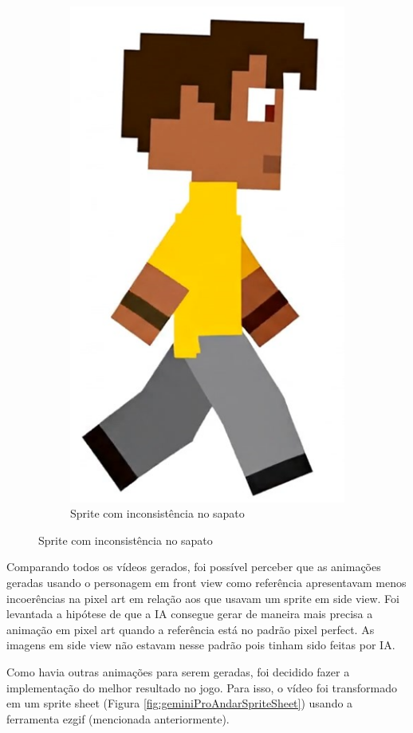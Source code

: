 \begin{figure}[htbp]
\begin{subfigure}{0.32\linewidth}
        \includegraphics[width=0.7\linewidth]{figs/geminiPro/chat7/sprite3.PNG}
        \caption{\small Sprite com inconsistência no sapato}
        \label{fig:GeminiProAndarComparaSide2Sprite2}
    \end{subfigure}

\end{figure}

 Comparando todos os vídeos gerados, foi possível perceber que as animações geradas usando o personagem em front view como referência apresentavam menos incoerências na pixel art em relação aos que usavam um sprite em side view. Foi levantada a hipótese de que a IA consegue gerar de maneira mais precisa a animação em pixel art quando a referência está no padrão pixel perfect. As imagens em side view não estavam nesse padrão pois tinham sido feitas por IA.

Como havia outras animações para serem geradas, foi decidido fazer a implementação do melhor resultado no jogo. Para isso, o vídeo foi transformado em um sprite sheet (Figura \ref{fig:geminiProAndarSpriteSheet}) usando a ferramenta ezgif (mencionada anteriormente).

